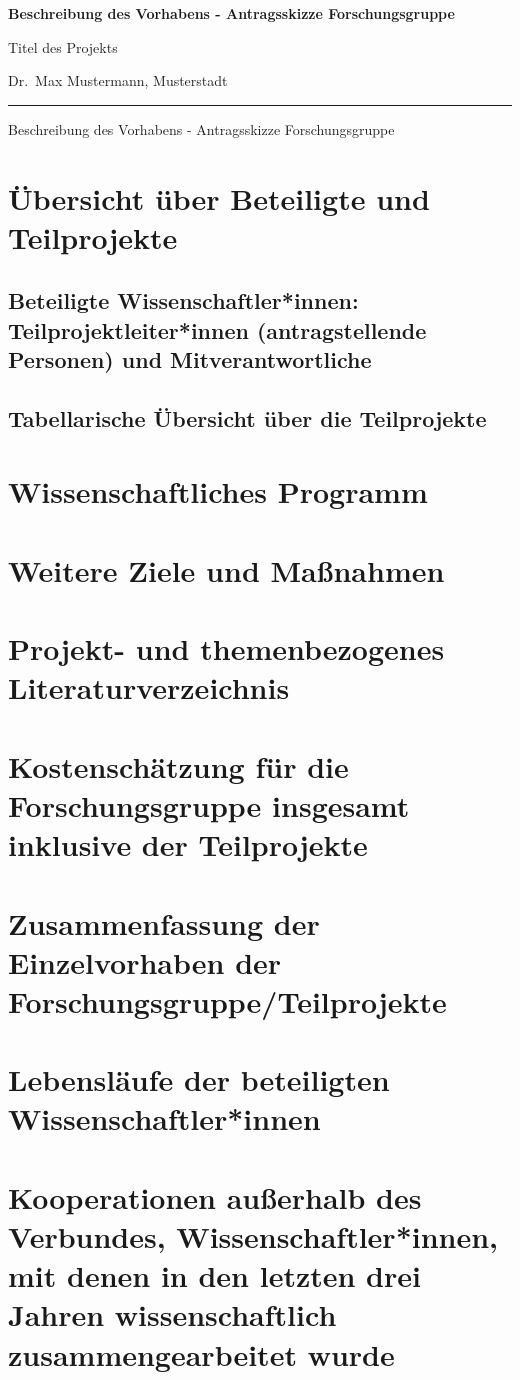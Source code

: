 \documentclass[german, 53.20]{proposal}
\newcommand{\spokesperson}{Dr.\ Max Mustermann, Musterstadt}
\newcommand{\project}{Titel des Projekts}
\begin{document}
{\raggedright{} \normalsize \bfseries
	Beschreibung des Vorhabens - Antragsskizze Forschungsgruppe \par
    \project{} \par
    \spokesperson{} \par
	\rule{\textwidth}{0.5pt} \par
	Beschreibung des Vorhabens - Antragsskizze Forschungsgruppe
}

\section{Übersicht über Beteiligte und Teilprojekte}

\subsection{Beteiligte Wissenschaftler*innen: Teilprojektleiter*innen (antragstellende Personen) und Mitverantwortliche}

\subsection{Tabellarische Übersicht über die Teilprojekte}


\section{Wissenschaftliches Programm}


\section{Weitere Ziele und Maßnahmen}


\section{Projekt- und themenbezogenes Literaturverzeichnis}
\printbibliography[heading=none]


\section{Kostenschätzung für die Forschungsgruppe insgesamt inklusive der Teilprojekte}


\section{Zusammenfassung der Einzelvorhaben der Forschungsgruppe/Teilprojekte}


\section{Lebensläufe der beteiligten Wissenschaftler*innen}


\section{Kooperationen außerhalb des Verbundes, Wissenschaftler*innen, mit denen in den letzten drei Jahren wissenschaftlich zusammengearbeitet wurde}
\end{document}
